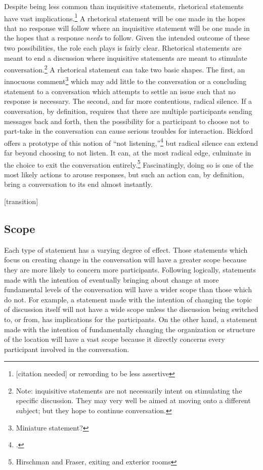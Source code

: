 \documentclass{article}
\begin{document}
Despite being less common than inquisitive statements, rhetorical statements have vast implications.\footnote{[citation needed] or rewording to be less assertive}
A rhetorical statement will be one made in the hopes that no response will follow where an inquisitive statement will be one made in the hopes that a response \emph{needs} to follow.
Given the intended outcome of these two possibilities, the role each plays is fairly clear.
Rhetorical statements are meant to end a discussion where inquisitive statements are meant to stimulate conversation.\footnote{Note: inquisitive statements are not necessarily intent on stimulating the specific discussion. They may very well be aimed at moving onto a different subject; but they hope to continue conversation.}
A rhetorical statement can take two basic shapes.
The first, an innocuous comment\footnote{Miniature statement?} which may add little to the conversation or a concluding statement to a conversation which attempts to settle an issue such that no response is necessary.
The second, and far more contentious, radical silence.
If a conversation, by definition, requires that there are multiple participants sending messages back and forth, then the possibility for a participant to choose not to part-take in the conversation can cause serious troubles for interaction.
Bickford offers a prototype of this notion of ``not listening,''\footcite[pg]{bickford96} but radical silence can extend far beyond choosing to not listen.
It can, at the most radical edge, culminate in the choice to exit the conversation entirely.\footnote{Hirschman and Fraser, exiting and exterior rooms}
Fascinatingly, doing so is one of the most likely actions to arouse responses, but such an action can, by definition, bring a conversation to its end almost instantly.

[transition]

\subsection{Scope}
Each type of statement has a varying degree of effect.
Those statements which focus on creating change in the conversation will have a greater scope because they are more likely to concern more participants.
Following logically, statements made with the intention of eventually bringing about change at more fundamental levels of the conversation will have a wider scope than those which do not.
For example, a statement made with the intention of changing the topic of discussion itself will not have a wide scope unless the discussion being switched to, or from, has implications for the participants.
On the other hand, a statement made with the intention of fundamentally changing the organization or structure of the location will have a vast scope because it directly concerns every participant involved in the conversation.
\end{document}
